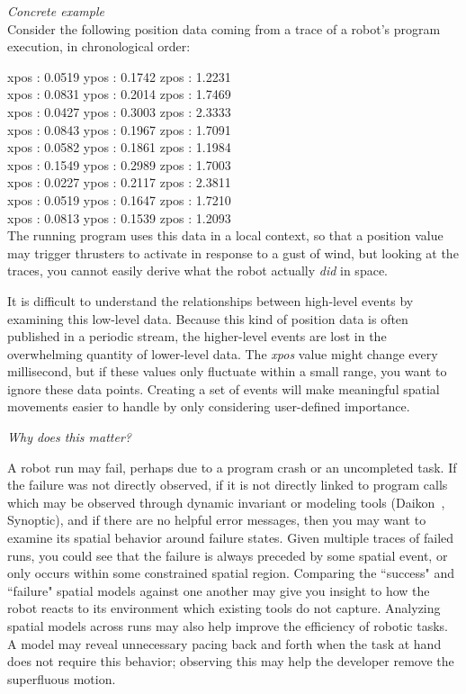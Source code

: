 \emph{Concrete example} \\
Consider the following position data coming from a trace of a robot's program execution, in chronological order:


xpos : 0.0519  ypos : 0.1742  zpos : 1.2231 \\
xpos : 0.0831  ypos : 0.2014  zpos : 1.7469 \\
xpos : 0.0427  ypos : 0.3003  zpos : 2.3333 \\
xpos : 0.0843  ypos : 0.1967  zpos : 1.7091 \\
xpos : 0.0582  ypos : 0.1861  zpos : 1.1984 \\
xpos : 0.1549  ypos : 0.2989  zpos : 1.7003 \\
xpos : 0.0227  ypos : 0.2117  zpos : 2.3811 \\
xpos : 0.0519  ypos : 0.1647  zpos : 1.7210 \\
xpos : 0.0813  ypos : 0.1539  zpos : 1.2093 \\

The running program uses this data in a local context, so that a position value may trigger thrusters to activate in response to a gust of wind, but looking at the traces, you cannot easily derive what the robot actually \emph{did} in space.

It is difficult to understand the relationships between high-level events by examining this low-level data.  
Because this kind of position data is often published in a periodic stream, the higher-level events are lost in the overwhelming quantity of lower-level data.
The \emph{xpos} value might change every millisecond, but if these values only fluctuate within a small range, you want to ignore these data points.  
Creating a set of events will make meaningful spatial movements easier to handle by only considering user-defined importance.  

\emph{Why does this matter?}  

A robot run may fail, perhaps due to a program crash or an uncompleted task.  
If the failure was not directly observed, if it is not directly linked to program calls which may be observed through dynamic invariant or modeling tools (Daikon~\cite{ernst2007daikon}, Synoptic), and if there are no helpful error messages, then you may want to examine its spatial behavior around failure states.
Given multiple traces of failed runs, you could see that the failure is always preceded by some spatial event, or only occurs within some constrained spatial region.
Comparing the ``success" and ``failure" spatial models against one another may give you insight to how the robot reacts to its environment which existing tools do not capture.
Analyzing spatial models across runs may also help improve the efficiency of robotic tasks.  
A model may reveal unnecessary pacing back and forth when the task at hand does not require this behavior; observing this may help the developer remove the superfluous motion.

